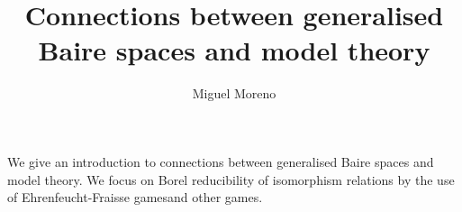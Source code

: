 \documentclass{amsart}
\title{Connections between generalised Baire spaces and model theory}
\author{Miguel Moreno}
\begin{document}
\maketitle
We give an introduction to connections between generalised Baire spaces and model theory. We focus on Borel reducibility of isomorphism relations by the use of Ehrenfeucht-Fraisse gamesand other games. 
\end{document}
